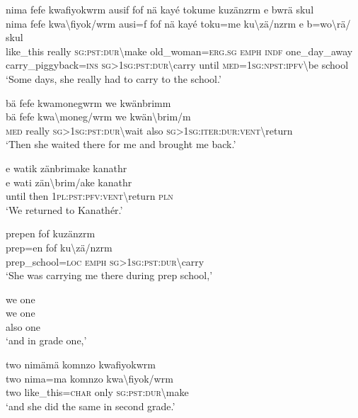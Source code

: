 \ea\label{ex:14:a3113}
nima fefe kwafiyokwrm ausif fof nä kayé tokume kuzänzrm e bwrä skul\\
\gll nima	fefe	kwa{\textbackslash}fiyok/wrm	ausi=f	fof	nä	kayé	toku=me	ku{\textbackslash}zä/nzrm	e	b=wo{\textbackslash}rä/	skul\\
     like\_this	really	\textsc{sg}:\textsc{pst}:\textsc{dur}{\textbackslash}make	old\_woman=\textsc{erg}.\textsc{sg}	\textsc{emph}	\textsc{indf}	one\_day\_away	carry\_piggyback=\textsc{ins}	\textsc{sg}>1\textsc{sg}:\textsc{pst}:\textsc{dur}{\textbackslash}carry	until	\textsc{med}=1\textsc{sg}:\textsc{npst}:\textsc{ipfv}{\textbackslash}be	school\\
\glt `Some days, she really had to carry to the school.'
\z

\ea\label{ex:14:a3116}
bä fefe kwamonegwrm we kwänbrimm\\
\gll bä	fefe	kwa{\textbackslash}moneg/wrm	we	kwän{\textbackslash}brim/m\\
     \textsc{med}	really	\textsc{sg}>1\textsc{sg}:\textsc{pst}:\textsc{dur}{\textbackslash}wait	also	\textsc{sg}>1\textsc{sg}:\textsc{iter}:\textsc{dur}:\textsc{vent}{\textbackslash}return\\
\glt `Then she waited there for me and brought me back.'
\z

\ea\label{ex:14:a3118}
e watik zänbrimake kanathr\\
\gll e	wati	zän{\textbackslash}brim/ake	kanathr\\
     until	then	1\textsc{pl}:\textsc{pst}:\textsc{pfv}:\textsc{vent}{\textbackslash}return	\textsc{pln}\\
\glt `We returned to Kanathér.'
\z

\ea\label{ex:14:a3119}
prepen fof kuzänzrm\\
\gll prep=en	fof	ku{\textbackslash}zä/nzrm\\
     prep\_school=\textsc{loc}	\textsc{emph}	\textsc{sg}>1\textsc{sg}:\textsc{pst}:\textsc{dur}{\textbackslash}carry\\
\glt `She was carrying me there during prep school,'
\z

\ea\label{ex:14:a3120}
we one\\
\gll we	one\\
     also	one\\
\glt `and in grade one,'
\z

\ea\label{ex:14:a3121}
two nimämä komnzo kwafiyokwrm\\
\gll two	nima=ma	komnzo	kwa{\textbackslash}fiyok/wrm\\
     two	like\_this=\textsc{char}	only	\textsc{sg}:\textsc{pst}:\textsc{dur}{\textbackslash}make\\
\glt `and she did the same in second grade.'
\z

